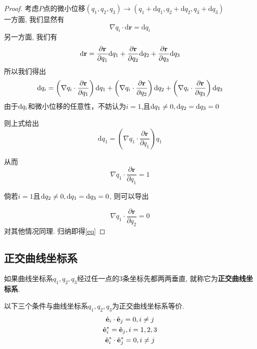\begin{proof}
    考虑$P$点的微小位移$(q_1,q_2,q_3)\to (q_1+\mathrm{d}q_1,q_2+\mathrm{d}q_2,q_3+\mathrm{d}q_3)$\\
    一方面, 我们显然有
    $$
    \nabla q_i\cdot \mathrm{d}\mathbf{r}=\mathrm{d}q_i
    $$
    另一方面, 我们有
    $$
    \mathrm{d}\mathbf{r}=\frac{\partial \mathbf{r}}{\partial q_1}\mathrm{d} q_1+\frac{\partial \mathbf{r}}{\partial q_2}\mathrm{d} q_2+\frac{\partial \mathbf{r}}{\partial q_3}\mathrm{d} q_3
    $$
    所以我们得出
    \begin{equation}
        \mathrm{d}q_i=\left( \nabla q_i\cdot \frac{\partial \mathbf{r}}{\partial q_1} \right)\mathrm{d} q_1+\left( \nabla q_i\cdot \frac{\partial \mathbf{r}}{\partial q_2} \right)\mathrm{d} q_2+\left( \nabla q_i\cdot \frac{\partial \mathbf{r}}{\partial q_3} \right)\mathrm{d} q_3
    \end{equation}
    由于$\mathrm{d} q_i$和微小位移的任意性，不妨认为$i=1$,且$\mathrm{d} q_1 \ne 0, \mathrm{d} q_2 =\mathrm{d} q_3 = 0$

    则上式给出
    $$
    \mathrm{d}q_1=\left( \nabla q_1\cdot \frac{\partial \mathbf{r}}{\partial q_1} \right) q_1
    $$
    
    从而
    \begin{equation}
        \nabla q_1\cdot \frac{\partial \mathbf{r}}{\partial q_1} = 1
    \end{equation}

    倘若$i=1$且$\mathrm{d} q_2 \ne 0, \mathrm{d} q_1 =\mathrm{d} q_3 = 0$, 则可以导出

    \begin{equation}
        \nabla q_1\cdot \frac{\partial \mathbf{r}}{\partial q_2} = 0
    \end{equation}
    对其他情况同理.
    归纳即得\cref{eq}
\end{proof}

\subsection{正交曲线坐标系}

\begin{definition}[正交曲线坐标系]
    如果曲线坐标系${q_1,q_2,q_3}$经过任一点的3条坐标先都两两垂直, 就称它为\textbf{正交曲线坐标系}.
\end{definition}

\begin{theorem}[正交曲线坐标系的判定]
    以下三个条件与曲线坐标系${q_1,q_2,q_3}$为正交曲线坐标系等价.
    \begin{subequations}
        \begin{gather}
            \hat{\mathbf{e}}_i \cdot \hat{\mathbf{e}}_j = 0,i\ne j\\ \label{eq3}
            \hat{\mathbf{e}}_i^*= \hat{\mathbf{e}}_j,i=1,2,3\\
            \hat{\mathbf{e}}_i^* \cdot \hat{\mathbf{e}}_j^* = 0,i\ne j
        \end{gather}
    \end{subequations}
\end{theorem}


